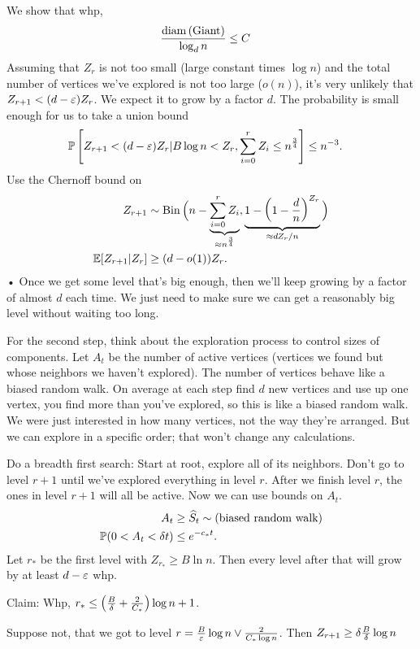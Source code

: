 We show that whp,
\begin{align}
\frac{\operatorname{diam}\left( \text{Giant} \right)}{\log_d n} &\le C
\end{align}
Assuming that  $Z_r$ is not too small (large constant times $\log n$) and the total number of vertices we've explored is not too large ($o(n)$), it's very unlikely that $Z_{r+1}<(d-\varepsilon)Z_r$. We expect it to grow by a factor $d$. The probability is small enough for us to take a union bound
\begin{align}
\mathbb{P}\left[ {Z_{r+1}<(d-\varepsilon) Z_r|
B\log n < Z_r, \sum_{i=0}^{r} Z_i \le n^{\frac{3}{4}}
} \right]&\le n^{-3}.
\end{align}
Use the Chernoff bound on 
\begin{align}
Z_{r+1} &\sim
\operatorname{Bin}\Big(
n - \underbrace{\sum_{i=0}^{r} Z_i}_{\approx n^{\frac{3}{4}}} , \underbrace{1-\left( {1-\frac{d}{n}} \right)^{Z_r}}_{\approx dZ_r/n}
\Big)\\
\mathbb{E}[Z_{r+1}|Z_r] &\ge (d-o(1)) Z_r.
\end{align}•
Once we get some level that's big enough, then we'll keep growing by a factor of almost $d$ each time. We just need to make sure we can get a reasonably big level without waiting too long.

For the second step, think about the exploration process to control sizes of components.
Let $A_t$ be the number of active vertices (vertices we found but whose neighbors we haven't explored). The number of vertices behave like a biased random walk.
On average at each step find $d$ new vertices and use up one vertex, you find more than you've explored, so this is like a biased random walk.
We were just interested in how many vertices, not the way they're arranged. But we can explore in a specific order; that won't change any calculations.

Do a breadth first search: Start at root, explore all of its neighbors. Don't go to level $r+1$ until we've explored everything in level $r$. After we finish level $r$, the ones in level $r+1$ will all be active.
Now we can use bounds on $A_t$.
\begin{align}
A_t &\ge \widehat{S}_t \sim \left( \text{biased random walk} \right)\\
\mathbb{P}(0<A_t<\delta t) &\le e^{-c_*t}.
\end{align}
Let $r_*$ be the first level with $Z_{r_*}\ge B\ln n$. Then every level after that will grow by at least $d-\varepsilon$ whp. 

Claim: Whp, $r_*\le \left( {\frac{B}{\delta}+\frac{2}{C_*}} \right)\log n+1$.

Suppose not, that we got to level $r=\frac{B}{\varepsilon}\log n\vee \frac{2}{C_*\log n}$. 
Then $Z_{r+1} \ge \delta \frac{B}{\delta}\log n$

